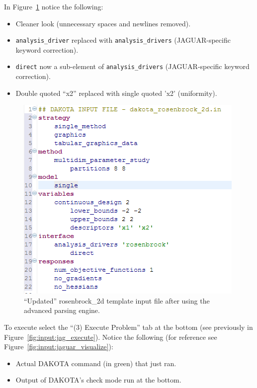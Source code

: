In Figure~\ref{fig:input:3fixed} notice the following:
\begin{itemize}
\item Cleaner look (unnecessary spaces and newlines removed).
\item \texttt{analysis\_driver} replaced with
  \texttt{analysis\_drivers} (JAGUAR-specific keyword correction).
\item \texttt{direct} now a sub-element of \texttt{analysis\_drivers}
  (JAGUAR-specific keyword correction).
\item Double quoted ``x2'' replaced with single quoted 'x2' (uniformity).
\end{itemize}
\begin{figure}[htbp]
  \centering
  \includegraphics[scale=0.6]{images/3fixed}
  \caption{``Updated'' rosenbrock\_2d template input file after using
    the advanced parsing engine.}
  \label{fig:input:3fixed}
\end{figure}      


To execute select the ``(3) Execute Problem'' tab at the bottom (see
previously in Figure~\ref{fig:input:jag_execute}).  Notice the
following (for reference see Figure~\ref{fig:input:jaguar_visualize}):
\begin{itemize}
\item Actual DAKOTA command (in green) that just ran.
\item Output of DAKOTA's check mode run at the bottom.
\end{itemize}

